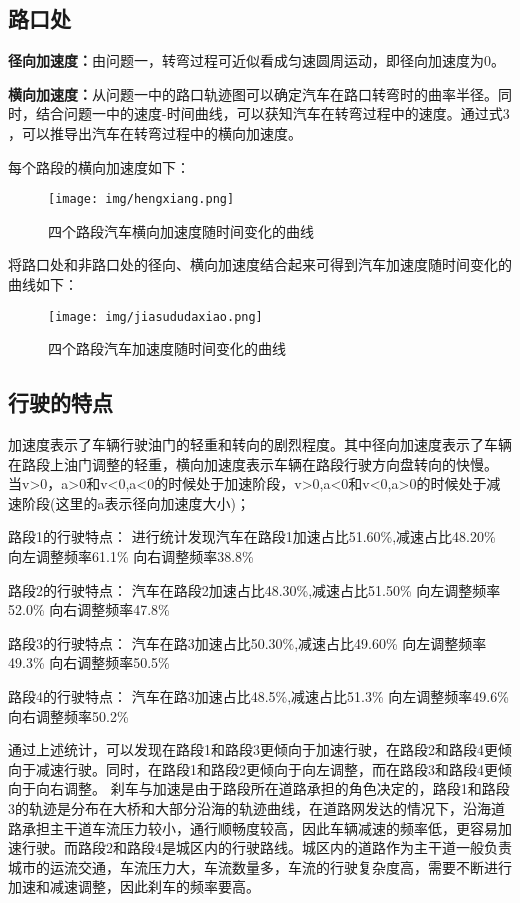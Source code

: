 \documentclass[withoutpreface,bwprint]{cumcmthesis} %
\begin{document}
\subsection{路口处}
\textbf{径向加速度：}由问题一，转弯过程可近似看成匀速圆周运动，即径向加速度为0。

\textbf{横向加速度：}从问题一中的路口轨迹图可以确定汽车在路口转弯时的曲率半径。同时，结合问题一中的速度-时间曲线，可以获知汽车在转弯过程中的速度。通过式3 ，可以推导出汽车在转弯过程中的横向加速度。

每个路段的横向加速度如下：
\begin{figure}[htbp]
    \centering
    \texttt{[image: img/hengxiang.png]}
     \captionsetup{font=small, position=below}
    \caption{四个路段汽车横向加速度随时间变化的曲线}
\end{figure}


将路口处和非路口处的径向、横向加速度结合起来可得到汽车加速度随时间变化的曲线如下：

\begin{figure}[htbp]
    \centering
    \texttt{[image: img/jiasududaxiao.png]}
     \captionsetup{font=small, position=below}
    \caption{四个路段汽车加速度随时间变化的曲线}
\end{figure}


\subsection{行驶的特点}
加速度表示了车辆行驶油门的轻重和转向的剧烈程度。其中径向加速度表示了车辆在路段上油门调整的轻重，横向加速度表示车辆在路段行驶方向盘转向的快慢。
当v>0，a>0和v<0,a<0的时候处于加速阶段，v>0,a<0和v<0,a>0的时候处于减速阶段(这里的a表示径向加速度大小)；


路段1的行驶特点：
进行统计发现汽车在路段1加速占比51.60\%,减速占比48.20\%
向左调整频率61.1\%
向右调整频率38.8\%


路段2的行驶特点：
汽车在路段2加速占比48.30\%,减速占比51.50\%
向左调整频率52.0\%
向右调整频率47.8\%


路段3的行驶特点：
汽车在路3加速占比50.30\%,减速占比49.60\%
向左调整频率49.3\%
向右调整频率50.5\%

路段4的行驶特点：
汽车在路3加速占比48.5\%,减速占比51.3\%
向左调整频率49.6\%
向右调整频率50.2\%

通过上述统计，可以发现在路段1和路段3更倾向于加速行驶，在路段2和路段4更倾向于减速行驶。同时，在路段1和路段2更倾向于向左调整，而在路段3和路段4更倾向于向右调整。
刹车与加速是由于路段所在道路承担的角色决定的，路段1和路段3的轨迹是分布在大桥和大部分沿海的轨迹曲线，在道路网发达的情况下，沿海道路承担主干道车流压力较小，通行顺畅度较高，因此车辆减速的频率低，更容易加速行驶。而路段2和路段4是城区内的行驶路线。城区内的道路作为主干道一般负责城市的运流交通，车流压力大，车流数量多，车流的行驶复杂度高，需要不断进行加速和减速调整，因此刹车的频率要高。
\end{document}

